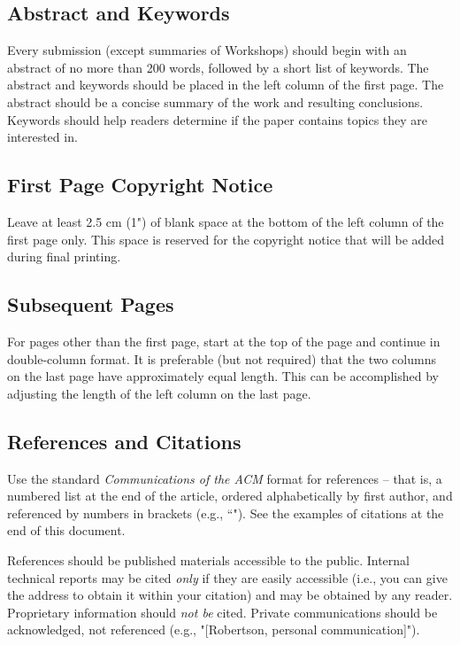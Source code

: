 \subsection{Abstract and Keywords}
Every submission (except summaries of Workshops) should 
begin with an abstract of no more than 200 words, followed 
by a short list of keywords. The abstract and keywords should be 
placed in the left column of the first page. The abstract 
should be a concise summary of the work and resulting 
conclusions. Keywords should help readers determine if the 
paper contains topics they are interested in.

\subsection{First Page Copyright Notice}
Leave at least 2.5 cm (1") of blank space at the 
bottom of the left column of the first page only. This space is 
reserved for the copyright notice that will be added during 
final printing.

\subsection{Subsequent Pages}
For pages other than the first page, start at the top of the page 
and continue in double-column format. It is preferable (but 
not required) that the two columns on the last page have 
approximately equal length. This can be accomplished by 
adjusting the length of the left column on the last page.

\subsection{References and Citations}
Use the standard {\it Communications of the ACM} format for 
references -- that is, a numbered list at the end of the 
article, ordered alphabetically by first author, and referenced 
by numbers in brackets (e.g., ``\cite{Anderson:Impacts}").
See the examples of citations at 
the end of this document.

References should be published materials accessible to the 
public. Internal technical reports may be cited {\it only} if they 
are easily accessible (i.e., you can give the address to obtain 
it within your citation) and may be obtained by any reader. 
Proprietary information should {\it not be} cited. Private 
communications should be acknowledged, not referenced 
(e.g., "[Robertson, personal communication]").

